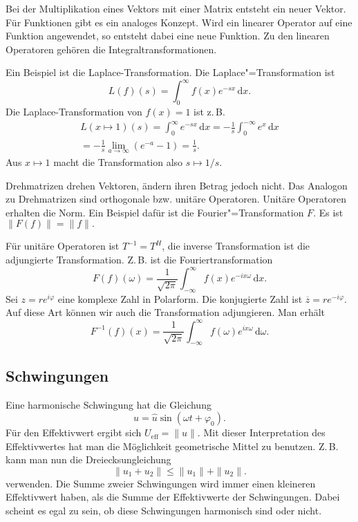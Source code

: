\documentclass[a4paper,10pt,fleqn,twocolumn,twoside]{article}
\begin{document}
Bei der Multiplikation eines Vektors mit einer Matrix entsteht ein
neuer Vektor. Für Funktionen gibt es ein analoges Konzept. Wird ein
linearer Operator auf eine Funktion angewendet, so entsteht dabei
eine neue Funktion. Zu den linearen Operatoren gehören die
Integraltransformationen.

Ein Beispiel ist die Laplace-Transformation.
Die Laplace"=Transformation ist
\[L(f)(s) = \int_0^{\infty} f(x)e^{-sx}\,\mathrm dx.\]
Die Laplace-Transformation von $f(x)=1$ ist z.\,B.
\begin{gather*}
L(x\mapsto 1)(s) = \int_0^{\infty} e^{-sx}\,\mathrm dx
= -\frac{1}{s} \int_0^{-\infty} e^x\,\mathrm dx\\
= -\frac{1}{s} \lim_{a\rightarrow\infty} (e^{-a}-1)
= \frac{1}{s}.
\end{gather*}
Aus $x\mapsto 1$ macht die Transformation also
$s\mapsto 1/s$.



Drehmatrizen drehen Vektoren, ändern ihren Betrag jedoch nicht.
Das Analogon zu Drehmatrizen sind orthogonale bzw. unitäre Operatoren.
Unitäre Operatoren erhalten die Norm. Ein Beispiel dafür ist die
Fourier"=Transformation $F$. Es ist $\|F(f)\| = \|f\|.$

Für unitäre Operatoren ist $T^{-1}=T^H$, die inverse Transformation
ist die adjungierte Transformation. Z.\,B. ist die Fouriertransformation
\[F(f)(\omega) = \frac{1}{\sqrt{2\pi}}
\int_{-\infty}^{\infty} f(x)e^{-ix\omega}\,\mathrm dx.\]
Sei $z=re^{i\varphi}$ eine komplexe Zahl in Polarform.
Die konjugierte Zahl ist
$\overline z = re^{-i\varphi}$. Auf diese Art können wir auch
die Transformation adjungieren. Man erhält
\[F^{-1}(f)(x) = \frac{1}{\sqrt{2\pi}}
\int_{-\infty}^{\infty} f(\omega)e^{ix\omega}\,\mathrm d\omega.\]

\subsection{Schwingungen}

Eine harmonische Schwingung hat die Gleichung
\[u=\hat u\sin(\omega t+\varphi_0).\]
Für den Effektivwert ergibt sich $U_\mathrm{eff} = \|u\|$.
Mit dieser Interpretation des Effektivwertes hat man die Möglichkeit
geometrische Mittel zu benutzen. Z.\,B. kann man nun die
Dreiecksungleichung
\[\|u_1+u_2\| \le \|u_1\|+\|u_2\|.\]
verwenden. Die Summe zweier Schwingungen wird immer einen kleineren
Effektivwert haben, als die Summe der Effektivwerte der Schwingungen.
Dabei scheint es egal zu sein, ob diese Schwingungen harmonisch sind
oder nicht.
\end{document}
